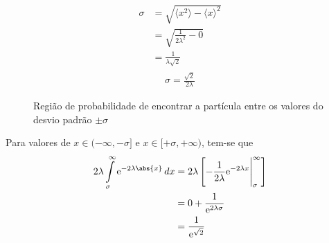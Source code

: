 \begin{prob}
\begin{sol}
\begin{enumerate}[label=\alph *)]
\begin{align}
\begin{split}
						\sigma &= \sqrt{\langle x^{2} \rangle-\langle x \rangle^{2}}\\
									 &= \sqrt{\frac{1}{2 \lambda^{2}}-0}\\
									 &= \frac{1}{\lambda\sqrt{2}}
					\end{split}						
				\end{align}
				\begin{align}
					\boxed{\sigma = \frac{\sqrt{2}}{2\lambda}}
				\end{align}
				\begin{figure}[ht!]
					\centering
					
					\caption{Região de probabilidade de encontrar a partícula entre os valores do desvio padrão $\pm\sigma$}
					\label{fig:pltQ01c}
				\end{figure}
				Para valores de $x\in (-\infty, -\sigma]$ e $x\in [+\sigma,+\infty)$, tem-se que
				\begin{align}
						\begin{split}
							2 \lambda \int\limits_{\sigma}^{\infty}\mathrm{e}^{-2 \lambda\abs{x}}\,d{x} &= 2 \lambda \left[-\frac{1}{2 \lambda}\mathrm{e}^{-2 \lambda x}\Bigg|_{\sigma}^{\infty} \right]\\
																																													&= 0+\frac{1}{\mathrm{e}^{2 \lambda \sigma}}\\
																																													&= \frac{1}{\mathrm{e}^{\sqrt{2}}}
						\end{split}
				\end{align}
		\end{enumerate} 	
	\end{sol}
\end{prob}

